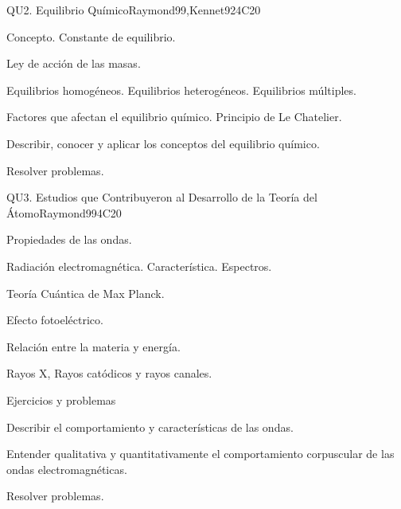 \begin{syllabus}
\begin{unit}{QU2. Equilibrio Químico}{}{Raymond99,Kennet92}{4}{C20}
\begin{topics}
      \item Concepto. Constante de equilibrio.
      \item Ley de acción de las masas.
      \item Equilibrios homogéneos. Equilibrios heterogéneos. Equilibrios múltiples.
      \item Factores que afectan el equilibrio químico. Principio de Le Chatelier.
    \end{topics}
   \begin{learningoutcomes}
      \item Describir, conocer y aplicar los conceptos del equilibrio químico.
      \item Resolver problemas.
   \end{learningoutcomes}
\end{unit}

\begin{unit}{QU3. Estudios que Contribuyeron al Desarrollo de la Teoría del Átomo}{}{Raymond99}{4}{C20}
\begin{topics}
      \item Propiedades de las ondas.
      \item Radiación electromagnética. Característica. Espectros.
      \item Teoría Cuántica de Max Planck.
      \item Efecto fotoeléctrico.
      \item Relación entre la materia y energía.
      \item Rayos X, Rayos catódicos y rayos canales.
      \item Ejercicios y problemas
\end{topics}

   \begin{learningoutcomes}
      \item Describir el comportamiento y características de las ondas.
      \item Entender qualitativa y quantitativamente el comportamiento corpuscular de las ondas electromagnéticas.
      \item Resolver problemas.
   \end{learningoutcomes}
\end{unit}


\end{syllabus}
